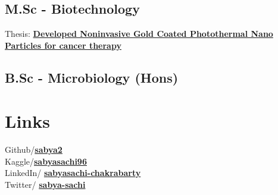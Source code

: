 \documentclass[letterpaper]{deedy-resume} %
\begin{document}
\begin{minipage}[t]{0.33\textwidth}
\vspace{0.5\topsep}
\sectionspace %
\subsection{M.Sc - Biotechnology}
\vspace{-0.7\topsep}
\hfill {}
Thesis: \href{https://www.thieme-connect.com/products/ejournals/abstract/10.1055/s-0042-1755497}{\bf Developed Noninvasive Gold Coated Photothermal Nano Particles for cancer therapy}

\sectionspace %
\subsection{B.Sc - Microbiology (Hons)}
\hfill {}





\section{Links} 

\faGithub \hspace{2pt} Github/\href{https://github.com/Sabya2}{\bf sabya2} \\
\faKaggle \hspace{2pt} Kaggle/\href{https://www.kaggle.com/sabyasachi96}{\bf sabyasachi96}\\
\faLinkedin \hspace{2pt} LinkedIn/ \href{https://www.linkedin.com/in/sabyasachi-chakrabarty/}{\bf sabyasachi-chakrabarty} \\
\faTwitterSquare \hspace{2pt} Twitter/ \href{https://twitter.com/sabya_sachi0}{\bf sabya-sachi} \\



\end{minipage} %
\hfill
%
\end{document}
